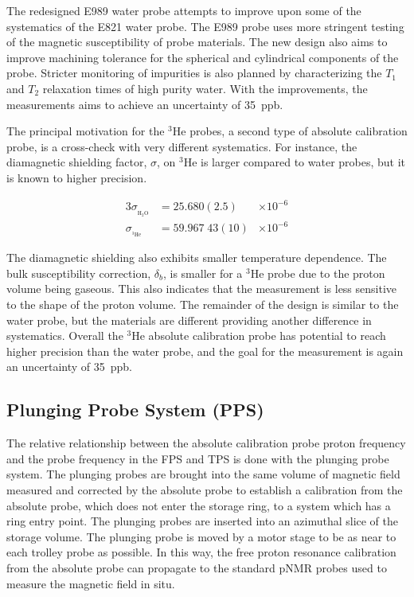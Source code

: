 The redesigned E989 water probe attempts to improve upon some of the systematics of the E821 water probe.  The E989 probe uses more stringent testing of the magnetic susceptibility of probe materials.  The new design also aims to improve machining tolerance for the spherical and cylindrical components of the probe. Stricter monitoring of impurities is also planned by characterizing the $T_1$ and $T_2$ relaxation times of high purity water.  With the improvements, the measurements aims to achieve an uncertainty of \SI{35}{ppb}. \cite{e989-tdr}

The principal motivation for the $\mathrm{^3He}$ probes, a second type of absolute calibration probe, is a cross-check with very different systematics.  For instance, the diamagnetic shielding factor, $\sigma$, on $\mathrm{^3He}$ is larger compared to water probes, but it is known to higher precision.

\begin{alignat}{3}
\sigma_{_{\mathrm{H_2 O}}} & = 25.680(2.5)  & \times 10^{-6} \\
\sigma_{_{\mathrm{^3He}}}  & = 59.967\;43(10) & \times 10^{-6} 
\end{alignat}

\noindent
The diamagnetic shielding also exhibits smaller temperature dependence.  The bulk susceptibility correction, $\delta_b$, is smaller for a $\mathrm{^3He}$ probe due to the proton volume being gaseous.  This also indicates that the measurement is less sensitive to the shape of the proton volume.  The remainder of the design is similar to the water probe, but the materials are different providing another difference in systematics.  Overall the $\mathrm{^3He}$ absolute calibration probe has potential to reach higher precision than the water probe, and the goal for the measurement is again an uncertainty of \SI{35}{ppb}. \cite{e989-tdr}

\subsection{Plunging Probe System (PPS)}

The relative relationship between the absolute calibration probe proton frequency and the probe frequency in the FPS and TPS is done with the plunging probe system.  The plunging probes are brought into the same volume of magnetic field measured and corrected by the absolute probe to establish a calibration from the absolute probe, which does not enter the storage ring, to a system which has a ring entry point.  The plunging probes are inserted into an azimuthal slice of the storage volume.  The plunging probe is moved by a motor stage to be as near to each trolley probe as possible.  In this way, the free proton resonance calibration from the absolute probe can propagate to the standard pNMR probes used to measure the \gmtwo magnetic field in situ.

